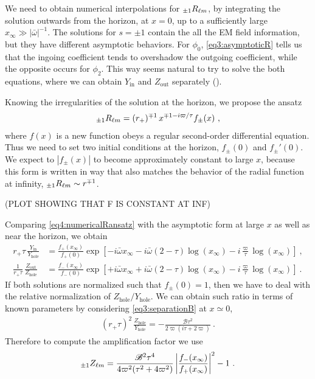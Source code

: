 We need to obtain numerical interpolations for $\uu[\pm 1]{R}{\ell m}$, by integrating the solution outwards from the horizon, at $x=0$, up to a sufficiently large $x_\infty \gg |\bar{\omega}|^{-1}$. 
The solutions for $s=\pm 1$ contain the all the EM field information, but they have different asymptotic behaviors.
For $\phi_0$, \eqref{eq3:asymptoticR} tells us that the ingoing coefficient tends to overshadow the outgoing coefficient, while the opposite occurs for $\phi_2$.
This way seems natural to try to solve the both equations, where we can obtain $Y_\mathrm{in}$ and $Z_\mathrm{out}$ separately ().

Knowing the irregularities of the solution at the horizon, we propose the ansatz
\begin{align}
	\label{eq4:numericalRansatz}
	\uu[\pm 1]{R}{\ell m} = (r_+)^{\mp 1} \, x^{ \mp 1 - i \varpi / \tau} f_{\pm}(x) ~,
\end{align}
where $f(x)$ is a new function obeys a regular second-order differential equation.
Thus we need to set two initial conditions at the horizon, $f_{\pm}(0)$ and $f_{\pm}{\!}'(0)$.
We expect to $|f_\pm(x)|$ to become approximately constant to large $x$, because this
form is written in way that also matches the behavior of the radial function at infinity, $\uu[\pm 1]{R}{\ell m}\sim r^{\mp 1}$.

(PLOT SHOWING THAT F IS CONSTANT AT INF)

Comparing \eqref{eq4:numericalRansatz} with the asymptotic form at large $x$ as well as near the horizon, we obtain
\begin{subequations}
	\begin{align}
			\label{eq4:YinFplusInf}
			r_{+} \tau \,\frac{Y_\mathrm{in}}{Y_\mathrm{hole}} &= \frac{f_{+}(x_\infty)}{f_{+}(0)} \exp\left[ - i \bar{\omega} x_\infty - i \bar{\omega} (2-\tau)\log(x_\infty)   -i \frac{\varpi}{\tau} \log(x_\infty) \right] ~, \\[0.15cm]
			\label{eq4:ZoutFminusInf}
			\frac{1}{r_{+} \tau} \,\frac{Z_\mathrm{out}}{Z_\mathrm{hole}} &= \frac{f_{-}(x_\infty)}{f_{-}(0)} \exp\left[ + i \bar{\omega} x_\infty + i \bar{\omega} (2-\tau)\log(x_\infty) -i \frac{\varpi}{\tau} \log(x_\infty) \right] ~.
	\end{align}
\end{subequations}
If both solutions are normalized such that $f_{\pm}(0) = 1$, then we have to deal with the relative normalization of $Z_\mathrm{hole}/Y_\mathrm{hole}$. We can obtain such ratio in terms of known parameters by considering \eqref{eq3:separationB} at $x\simeq0$,
\begin{align}
	(r_{+} \tau)^2 \,\frac{Z_\mathrm{hole}}{Y_\mathrm{hole}} = -\frac{\mathscr{B} \tau^2 }{2 \varpi (i \tau + 2 \varpi)} ~.
\end{align}
Therefore to compute the amplification factor we use
\begin{align}
	\label{eq4:ZFPlusMinus}
	\uu[\pm 1]{Z}{\ell m} = \frac{\mathscr{B}^2 \tau^4 }{4 \varpi^2 (\tau^2 + 4 \varpi^2)} \left| \frac{f_{-}(x_\infty)}{f_{+}(x_\infty)} \right|^2 - 1 ~.
\end{align}

